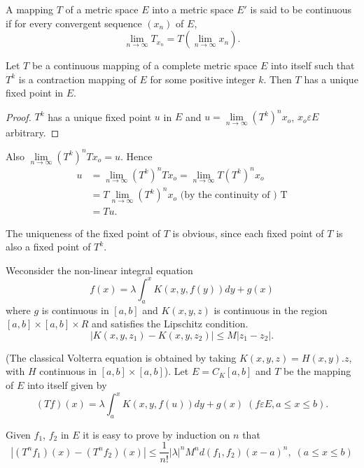\begin{Definition}%
  A mapping $T$ of a metric space $E$ into a metric space $E'$ is said
  to be continuous if for every convergent sequence $(x_n) $ of $E$,  
  $$
  \lim_{n \to \infty} T_{x_{n}} = T (\lim_{n \to \infty} x_n).
  $$
\end{Definition}

\begin{thmm}%
  Let $T$ be a continuous mapping of a complete metric space $E$ into
  itself such that $T^{k}$ is a contraction mapping of $E$ for some
  positive integer $k$. Then $T$ has a unique fixed point in $E$. 
\end{thmm}

\begin{proof}
  $T^k$ has a unique fixed point $u$ in $E$ and $u = \lim\limits_{n
    \to \infty} (T^k)^n x_o$, $x_o \varepsilon E$ arbitrary. 
\end{proof}

Also $\lim\limits_{n \to \infty} (T^k)^n Tx_o = u$. Hence 
\begin{align*}
  u & = \lim_{n \to \infty}(T^k)^n Tx_o = \lim_{n \to \infty} T (T^k)^n x_o\\
  & = T \lim_{n \to \infty} (T^k)^n x_o  \text{ (by the continuity of
    ) T}\\ 
  & = Tu.
\end{align*}

The uniqueness of the fixed point of $T$ is obvious, since each fixed
point of $T$ is also a fixed point of $T^k$. 

\begin{example*}
  We\pageoriginale consider the non-linear integral equation
  \begin{equation*}
    f(x) = \lambda \int^{x}_{a} K (x,y, f(y))dy + g(x)
    \tag{1}\label{chap1:exameq1} 
  \end{equation*}
where $g$ is continuous in $[a,b]$ and $K (x,y,z)$ is continuous in
the region $[a,b]\times [a,b] \times R$ and satisfies the Lipschitz
condition. 
$$
|K (x,y,z_1) - K (x,y,z_2)| \leq M |z_1 - z_2|.
$$
\end{example*}
(The classical Volterra equation is obtained by taking $K(x,y,z)= H
(x,y).z$, with $H$ continuous in $[a,b] \times [a,b]$). Let $E= C_K
[a,b]$ and $T$ be the mapping of $E$ into itself given by  
$$
(Tf) (x) = \lambda \int^{x}_{a} K (x,y,f(u)) dy + g(x)\;  (f \varepsilon E, a
\leq x \leq b). 
$$

Given $f_1$, $f_2$ in $E$ it is easy to prove by induction on $n$ that
$$
|(T^n f_1) (x) - (T^n f_2) (x)| \leq \frac{1}{n !} |\lambda|^n M^n d
(f_1, f_2) (x-a)^n , \; (a \leq x \leq b) 
$$

